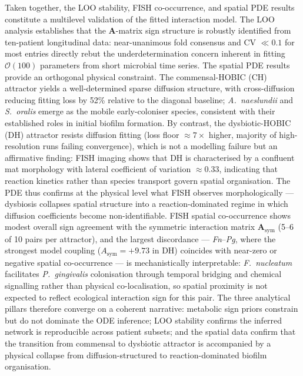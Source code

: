 Taken together, the LOO stability, FISH co-occurrence, and spatial PDE results constitute a multilevel validation of the fitted interaction model. The LOO analysis establishes that the $\mathbf{A}$-matrix sign structure is robustly identified from ten-patient longitudinal data: near-unanimous fold consensus and CV $\ll 0.1$ for most entries directly rebut the underdetermination concern inherent in fitting $\mathcal{O}(100)$ parameters from short microbial time series. The spatial PDE results provide an orthogonal physical constraint. The commensal-HOBIC (CH) attractor yields a well-determined sparse diffusion structure, with cross-diffusion reducing fitting loss by 52\% relative to the diagonal baseline; \textit{A.\ naeslundii} and \textit{S.\ oralis} emerge as the mobile early-coloniser species, consistent with their established roles in initial biofilm formation. By contrast, the dysbiotic-HOBIC (DH) attractor resists diffusion fitting (loss floor $\approx 7\times$ higher, majority of high-resolution runs failing convergence), which is not a modelling failure but an affirmative finding: FISH imaging shows that DH is characterised by a confluent mat morphology with lateral coefficient of variation $\approx 0.33$, indicating that reaction kinetics rather than species transport govern spatial organisation. The PDE thus confirms at the physical level what FISH observes morphologically --- dysbiosis collapses spatial structure into a reaction-dominated regime in which diffusion coefficients become non-identifiable. FISH spatial co-occurrence shows modest overall sign agreement with the symmetric interaction matrix $\mathbf{A}_\mathrm{sym}$ (5--6 of 10 pairs per attractor), and the largest discordance --- \textit{Fn}--\textit{Pg}, where the strongest model coupling ($A_\mathrm{sym} = +9.73$ in DH) coincides with near-zero or negative spatial co-occurrence --- is mechanistically interpretable: \textit{F.\ nucleatum} facilitates \textit{P.\ gingivalis} colonisation through temporal bridging and chemical signalling rather than physical co-localisation, so spatial proximity is not expected to reflect ecological interaction sign for this pair. The three analytical pillars therefore converge on a coherent narrative: metabolic sign priors constrain but do not dominate the ODE inference; LOO stability confirms the inferred network is reproducible across patient subsets; and the spatial data confirm that the transition from commensal to dysbiotic attractor is accompanied by a physical collapse from diffusion-structured to reaction-dominated biofilm organisation.
